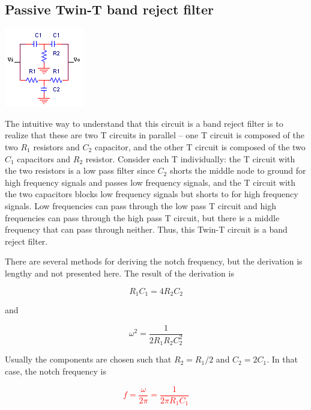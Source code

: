 \subsection{Passive Twin-T band reject filter}
\begin{center}
	\includegraphics{schematics/passiveTwinTbandrejectfilter.PNG}
\end{center}
The intuitive way to understand that this circuit is a band reject filter is to realize that these are two T circuits in parallel -- one T circuit is composed of the two $R_1$ resistors and $C_2$ capacitor, and the other T circuit is composed of the two $C_1$ capacitors and $R_2$ resistor.
Consider each T individually:
the T circuit with the two resistors is a low pass filter since $C_2$ shorts the middle node to ground for high frequency signals and passes low frequency signals, and the T circuit with the two capacitors blocks low frequency signals but shorts \vin to \vout for high frequency signals.
Low frequencies can pass through the low pass T circuit and high frequencies can pass through the high pass T circuit, but there is a middle frequency that can pass through neither.
Thus, this Twin-T circuit is a band reject filter.

There are several methods for deriving the notch frequency, but the derivation is lengthy and not presented here.
The result of the derivation \autocite[see][]{cr-bond-twin-t-notch} is

\begin{equation}
	R_1C_1 = 4R_2C_2
\end{equation}

and

\begin{equation}
\omega^{2} = \frac{1}{2R_1R_2C_2^{2}}
\end{equation}

Usually the components are chosen such that $R_{2} = R_1/2$ and $C_2 = 2C_1$.
In that case, the notch frequency is

\textcolor{red}{
\begin{equation}
f = \frac{\omega}{2\pi} = \frac{1}{2\pi R_1C_1}
\label{eq:passiveTwinTnotchfreq}
\end{equation}
}

